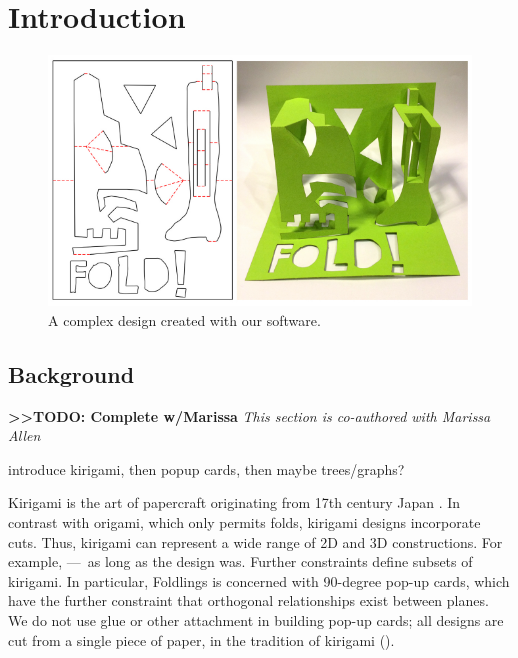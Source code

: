 \chapter{Introduction}

\begin{figure}[htbp]
\centering
\includegraphics{figures/shared/01_Background/complexFoldlings.pdf}
\caption{A complex design created with our software.}
\end{figure}

\section{Background}\label{background}

\textbf{\textgreater{}\textgreater{}TODO: Complete w/Marissa} \emph{This
section is co-authored with Marissa Allen}

introduce kirigami, then popup cards, then maybe trees/graphs?

Kirigami is the art of papercraft originating from 17th century Japan
\citet{temko1978magic}. In contrast with origami, which only permits
folds, kirigami designs incorporate cuts. Thus, kirigami can represent a
wide range of 2D and 3D constructions. For example, ---~as long as the
design was. Further constraints define subsets of kirigami. In
particular, Foldlings is concerned with 90-degree pop-up cards, which
have the further constraint that orthogonal relationships exist between
planes. We do not use glue or other attachment in building pop-up cards;
all designs are cut from a single piece of paper, in the tradition of
kirigami (\citet{temko1978magic}).

